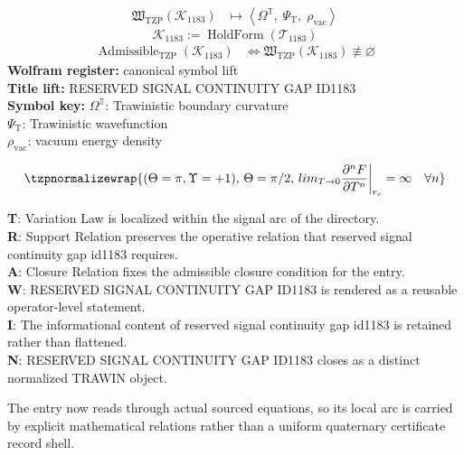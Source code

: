 \noindent
\begin{minipage}[t]{0.48\linewidth}
\begingroup
\small
\[
\begin{aligned}
\mathfrak{W}_{\mathrm{TZP}}\!\left(\mathcal{K}_{1183}\right)
&\longmapsto
\left\langle \Omega^{\mathbb{T}},\; \Psi_{\mathrm{T}},\; \rho_{\mathrm{vac}} \right\rangle
\end{aligned}
\]
\[
\mathcal{K}_{1183}
:=
\operatorname{HoldForm}\!\left(\mathcal{T}_{1183}\right)
\]
\[
\begin{aligned}
\operatorname{Admissible}_{\mathrm{TZP}}\!\left(\mathcal{K}_{1183}\right)
&\Longleftrightarrow
\mathfrak{W}_{\mathrm{TZP}}\!\left(\mathcal{K}_{1183}\right)\not\equiv\varnothing
\end{aligned}
\]
\textbf{Wolfram register:} canonical symbol lift\\
\textbf{Title lift:} RESERVED SIGNAL CONTINUITY GAP ID1183\\
\textbf{Symbol key:} \(\Omega^{\mathbb{T}}\): Trawinistic boundary curvature\\ \(\Psi_{\mathrm{T}}\): Trawinistic wavefunction\\ \(\rho_{\mathrm{vac}}\): vacuum energy density
\par
\endgroup
\end{minipage}\hfill
\begin{minipage}[t]{0.48\linewidth}
\[
\tzpnormalizewrap{(\Theta=\pi, \Upsilon=+1),\,\Theta = \pi/2,\,lim_{T \to 0} \frac{\partial^n F}{\partial T^n}\bigg|_{r_c} = \infty \quad \forall n}
\]

\small
\textbf{T}: Variation Law is localized within the signal arc of the directory.\\
\textbf{R}: Support Relation preserves the operative relation that reserved signal continuity gap id1183 requires.\\
\textbf{A}: Closure Relation fixes the admissible closure condition for the entry.\\
\textbf{W}: RESERVED SIGNAL CONTINUITY GAP ID1183 is rendered as a reusable operator-level statement.\\
\textbf{I}: The informational content of reserved signal continuity gap id1183 is retained rather than flattened.\\
\textbf{N}: RESERVED SIGNAL CONTINUITY GAP ID1183 closes as a distinct normalized TRAWIN object.
\normalsize
\end{minipage}

The entry now reads through actual sourced equations, so its local arc is carried by explicit mathematical relations rather than a uniform quaternary certificate record shell.
\clearpage

